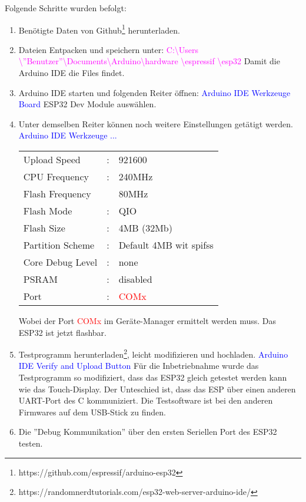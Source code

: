 Folgende Schritte wurden befolgt:
\begin{enumerate}
\item Benötigte Daten von Github\footnote{https://github.com/espressif/arduino-esp32} herunterladen.\newline
\item Dateien Entpacken und speichern unter:\newline
\textcolor{magenta}{C:\textbackslash Users \textbackslash ''Benutzer''\textbackslash Documents\textbackslash Arduino\textbackslash hardware \textbackslash espressif \textbackslash esp32}\newline
Damit die Arduino IDE die Files findet.\newline
\item Arduino IDE starten und folgenden Reiter öffnen:\newline
\textcolor{blue}{Arduino IDE \textrightarrow Werkzeuge \textrightarrow Board}\newline
ESP32 Dev Module auswählen.\newline
\item Unter demselben Reiter können noch weitere Einstellungen getätigt werden.\newline
\textcolor{blue}{Arduino IDE \textrightarrow Werkzeuge \textrightarrow ...}\newline
\begin{tabular}{lll}
Upload Speed & : & 921600\\
CPU Frequency & : & 240MHz\\
Flash Frequency & & 80MHz\\
Flash Mode & : & QIO\\
Flash Size & : & 4MB (32Mb)\\
Partition Scheme & : & Default 4MB wit spifss\\
Core Debug Level & : & none\\
PSRAM & : & disabled\\
Port & : & \textcolor{red}{COMx}\\
\end{tabular}

Wobei der Port \textcolor{red}{COMx} im Geräte-Manager ermittelt werden muss. Das ESP32 ist jetzt flashbar.\newline

\item Testprogramm herunterladen\footnote{https://randomnerdtutorials.com/esp32-web-server-arduino-ide/}, leicht modifizieren und hochladen.\newline
\textcolor{blue}{Arduino IDE \textrightarrow Verify and Upload Button} \newline
Für die Inbetriebnahme wurde das Testprogramm so modifiziert, dass das ESP32 gleich getestet werden kann wie das Touch-Display. Der Unteschied ist, dass das ESP über einen anderen UART-Port des \textmu C kommuniziert. Die Testsoftware ist bei den anderen Firmwares auf dem USB-Stick zu finden.\newline
\item Die ''Debug Kommunikation'' über den ersten Seriellen Port des ESP32 testen.


\end{enumerate}
